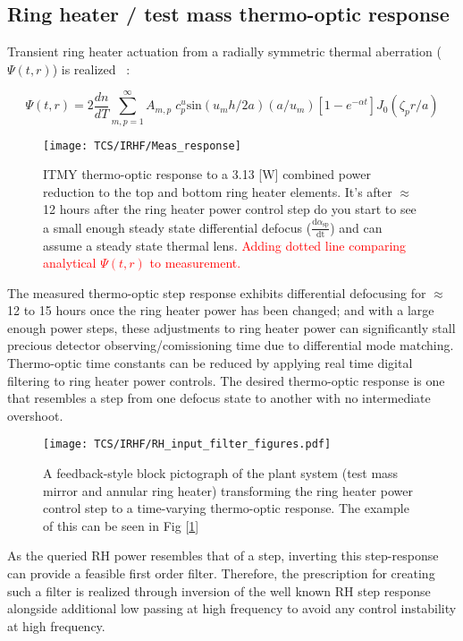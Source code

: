 \subsection{Ring heater / test mass thermo-optic response}
Transient ring heater actuation from a radially symmetric thermal aberration ($\Psi(t,r)$) is realized ~\cite{ramette:2016}:

\begin{equation}
	\Psi(t,r)=2\frac{dn}{dT} \sum^{\infty}_{m,p = 1} A_{m,p} \; c^{u}_{p} \mathrm{sin}(u_m h /2a) (a/u_m)[1-e^{-\alpha t}] J_0(\zeta_p r/a)
\end{equation}

\begin{figure}[H]
     \texttt{[image: TCS/IRHF/Meas\_response]}
     \caption{ITMY thermo-optic response to a 3.13 [W] combined power reduction to the top and bottom ring heater elements. It's after $\approx$ 12 hours after the ring heater power control step do you start to see a small enough steady state differential defocus ($\frac{\mathrm{d} \alpha_\mathrm{sp}}{\mathrm{dt}}$) and can assume a steady state thermal lens. \textcolor{red}{Adding dotted line comparing analytical $\Psi(t,r)$ to measurement.} }
     \label{fig:RHresp}
\end{figure}

The measured thermo-optic step response exhibits differential defocusing for $\approx$ 12 to 15 hours once the ring heater power has been changed; and with a large enough power steps, these adjustments to ring heater power can significantly stall precious detector observing/comissioning time due to differential mode matching. Thermo-optic time constants can be reduced by applying real time digital filtering to ring heater power controls. The desired thermo-optic response is one that resembles a step from one defocus state to another with no intermediate overshoot. 
\begin{figure}[H]
    \centering
    \texttt{[image: TCS/IRHF/RH\_input\_filter\_figures.pdf]}
    \caption{A feedback-style block pictograph of the plant system (test mass mirror and annular ring heater) transforming the ring heater power control step to a time-varying thermo-optic response. The example of this can be seen in Fig [\ref{fig:RHresp}]}
    \label{fig:justplant}
\end{figure}

As the queried RH power resembles that of a step, inverting this step-response can provide a feasible first order filter. Therefore, the prescription for creating such a filter is realized through inversion of the well known RH step response alongside additional low passing at high frequency to avoid any control instability at high frequency. 

